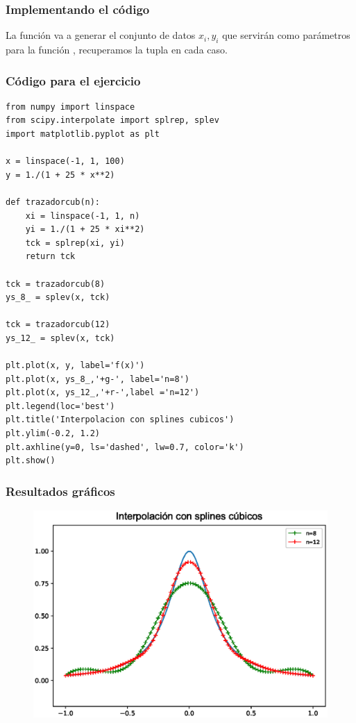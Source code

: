 \begin{frame}
\frametitle{Implementando el código}
La función  va a generar el conjunto de datos $x_{i}, y_{i}$ que servirán como parámetros para la función , recuperamos la tupla  en cada caso.
\end{frame}
\begin{frame}
\frametitle{Código para el ejercicio}
\begin{lstlisting}[caption=Código para el ejercicio, style= FormattedNumber, basicstyle=\linespread{0.9}\ttfamily\small, columns=fullflexible]
from numpy import linspace
from scipy.interpolate import splrep, splev
import matplotlib.pyplot as plt

x = linspace(-1, 1, 100)
y = 1./(1 + 25 * x**2)

def trazadorcub(n):
    xi = linspace(-1, 1, n)
    yi = 1./(1 + 25 * xi**2)
    tck = splrep(xi, yi)
    return tck

tck = trazadorcub(8)
ys_8_ = splev(x, tck)

tck = trazadorcub(12)
ys_12_ = splev(x, tck)

plt.plot(x, y, label='f(x)')
plt.plot(x, ys_8_,'+g-', label='n=8')
plt.plot(x, ys_12_,'+r-',label ='n=12')
plt.legend(loc='best')
plt.title('Interpolacion con splines cubicos')
plt.ylim(-0.2, 1.2)
plt.axhline(y=0, ls='dashed', lw=0.7, color='k')
plt.show()
\end{lstlisting}
\end{frame}
\begin{frame}
\frametitle{Resultados gráficos}
\begin{figure}
	\centering
	\includegraphics[scale=0.5]{Imagenes/Funcion_Runge_2017_03.eps} 
\end{figure}
\end{frame}
